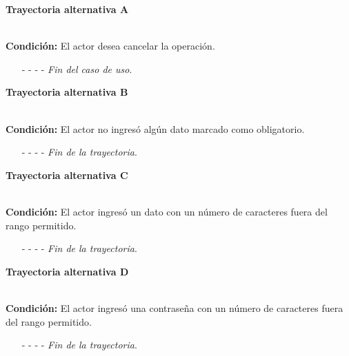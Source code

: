 	\hypertarget{CU3-2:TAA}{\textbf{Trayectoria alternativa A}}\\
	\noindent \textbf{Condición:} El actor desea cancelar la operación.
	\begin{enumerate}
		\UCpaso[\UCactor] Solicita cancelar la operación oprimiendo el botón  de la pantalla .
		\UCpaso[\UCsist] Muestra la pantalla .
		\item[- -] - - {\em {Fin del caso de uso}}.%
	\end{enumerate}
\hypertarget{CU3-2:TAB}{\textbf{Trayectoria alternativa B}}\\
\noindent \textbf{Condición:} El actor no ingresó algún dato marcado como obligatorio.
\begin{enumerate}
	\UCpaso[\UCsist] Muestra el mensaje  señalando el campo que presenta el error en la pantalla .
	\UCpaso Regresa al paso \ref{CU3.2-P5} de la trayectoria principal.
	\item[- -] - - {\em {Fin de la trayectoria}}.%
\end{enumerate}
\hypertarget{CU3-2:TAC}{\textbf{Trayectoria alternativa C}}\\
\noindent \textbf{Condición:} El actor ingresó un dato con un número de caracteres fuera del rango permitido.
\begin{enumerate}
	\UCpaso[\UCsist] Muestra el mensaje  señalando el campo que presenta el error en la pantalla .
	\UCpaso Regresa al paso \ref{CU3.2-P5} de la trayectoria principal.
	\item[- -] - - {\em {Fin de la trayectoria}}.%
\end{enumerate}
\hypertarget{CU3-2:TAD}{\textbf{Trayectoria alternativa D}}\\
\noindent \textbf{Condición:} El actor ingresó una contraseña con un número de caracteres fuera del rango permitido.
\begin{enumerate}
	\UCpaso[\UCsist] Muestra el mensaje  señalando el campo que presenta el error en la pantalla .
	\UCpaso Regresa al paso \ref{CU3.2-P5} de la trayectoria principal.
	\item[- -] - - {\em {Fin de la trayectoria}}.%
\end{enumerate}
